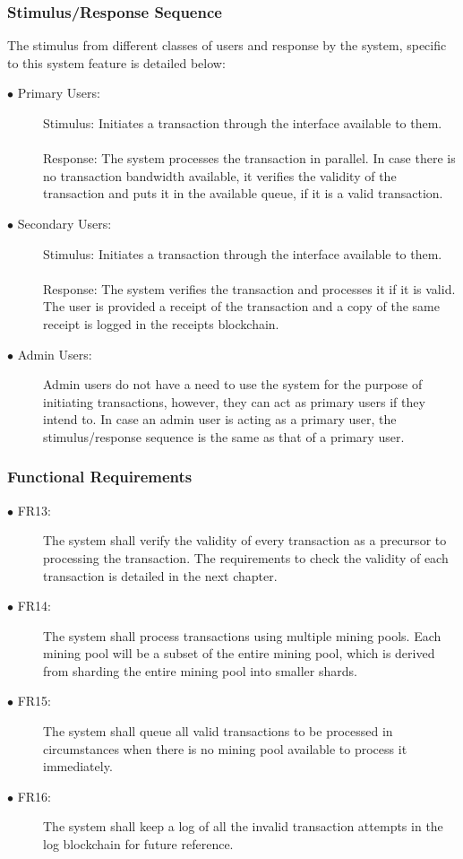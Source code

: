 \documentclass[a4paper,twoside,phd]{BYUPhys}
\begin{document}
\subsubsection{Stimulus/Response Sequence}
The stimulus from different classes of users and response by the system, specific to this system feature is detailed below:
\begin{description}
\item[$\bullet$ Primary Users:] Stimulus: Initiates a transaction through the interface available to them.
\\
\\
Response: The system processes the transaction in parallel. In case there is no transaction bandwidth available, it verifies the validity of the transaction and puts it in the available queue, if it is a valid transaction.
\item[$\bullet$ Secondary Users:] Stimulus: Initiates a transaction through the interface available to them.
\\
\\
Response:  The system verifies the transaction and processes it if it is valid. The user is provided a receipt of the transaction and a copy of the same receipt is logged in the receipts blockchain.
\item[$\bullet$ Admin Users:] Admin users do not have a need to use the system for the purpose of initiating transactions, however, they can act as primary users if they intend to. In case an admin user is acting as a primary user, the stimulus/response sequence is the same as that of a primary user.
\end{description}
\subsubsection{Functional Requirements}
\begin{description}
\item[$\bullet$ FR13:] The system shall verify the validity of every transaction as a precursor to processing the transaction. The requirements to check the validity of each transaction is detailed in the next chapter.
\item[$\bullet$ FR14:] The system shall process transactions using multiple mining pools. Each mining pool will be a subset of the entire mining pool, which is derived from sharding the entire mining pool into smaller shards.
\item[$\bullet$ FR15:] The system shall queue all valid transactions to be processed in circumstances when there is no mining pool available to process it immediately.
\item[$\bullet$ FR16:] The system shall keep a log of all the invalid transaction attempts in the log blockchain for future reference.
\end{description}
\end{document}
